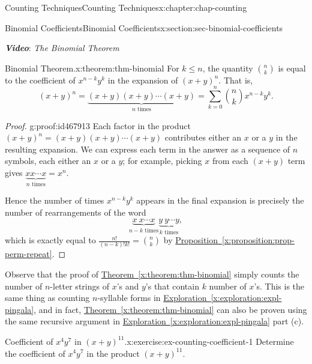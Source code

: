 \documentclass[oneside,10pt,]{book}
\newcommand{\xreffont}{\relax}
\newcommand{\alert}[1]{\textbf{\textit{#1}}}
\numberwithin{equation}{section}
\begin{document}
\begin{chapterptx}{Counting Techniques}{}{Counting Techniques}{}{}{x:chapter:chap-counting}
\begin{sectionptx}{Binomial Coefficients}{}{Binomial Coefficients}{}{}{x:section:sec-binomial-coefficients}
\begin{sidebyside}{1}{0}{0}{0}
\begin{sbspanel}{1}
\begin{tcbraster}[raster columns=2, raster column skip=1pt, raster halign=center, raster force size=false, raster left skip=0pt, raster right skip=0pt]
\end{tcbraster}%
\end{sbspanel}%
\end{sidebyside}%
\par
\alert{Video}: \emph{The Binomial Theorem}%
\begin{theorem}{Binomial Theorem.}{}{x:theorem:thm-binomial}%
For \(k \leq n\), the quantity \(\displaystyle\binom{n}{k}\) is equal to the coefficient of \(x^{n-k}y^k\) in the expansion of \((x+y)^n\). That is,%
\begin{equation*}
(x+y)^n = \underbrace{(x+y)(x+y)\cdots(x+y)}_\text{$n$ times} = \displaystyle\sum_{k=0}^n \binom{n}{k}x^{n-k}y^k\text{.}
\end{equation*}
%
\end{theorem}
\begin{proof}{}{g:proof:id467913}
Each factor in the product \((x+y)^n = (x+y)(x+y)\cdots(x+y)\) contributes either an \(x\) or a \(y\) in the resulting expansion. We can express each term in the answer as a sequence of \(n\) symbols, each either an \(x\) or a \(y\); for example, picking \(x\) from each \((x+y)\) term gives \(\underbrace{xx\cdots x}_\text{$n$ times}=x^n\).%
\par
Hence the number of times \(x^{n-k}y^k\) appears in the final expansion is precisely the number of rearrangements of the word%
\begin{equation*}
\underbrace{x\ x\cdots x}_\text{$n-k$ times}\underbrace{y\ y\cdots y}_\text{$k$ times},
\end{equation*}
which is exactly equal to \(\frac{n!}{(n-k)!k!} = \binom{n}{k}\) by \hyperref[x:proposition:prop-perm-repeat]{Proposition~{\xreffont\ref{x:proposition:prop-perm-repeat}}}.%
\end{proof}
Observe that the proof of \hyperref[x:theorem:thm-binomial]{Theorem~{\xreffont\ref{x:theorem:thm-binomial}}} simply counts the number of \(n\)-letter strings of \(x\)'s and \(y\)'s that contain \(k\) number of \(x\)'s. This is the same thing as counting \(n\)-syllable forms in \hyperref[x:exploration:expl-pingala]{Exploration~{\xreffont\ref{x:exploration:expl-pingala}}}, and in fact, \hyperref[x:theorem:thm-binomial]{Theorem~{\xreffont\ref{x:theorem:thm-binomial}}} can also be proven using the same recursive argument in \hyperref[x:exploration:expl-pingala]{Exploration~{\xreffont\ref{x:exploration:expl-pingala}}} part (c).%
\begin{inlineexercise}{Coefficient of \(x^4y^7\) in \((x+y)^{11}\).}{x:exercise:ex-counting-coefficient-1}%
Determine the coefficient of \(x^4y^7\) in the product \((x+y)^{11}\).%

\end{inlineexercise}
\end{sectionptx}
\end{chapterptx}
\end{document}
